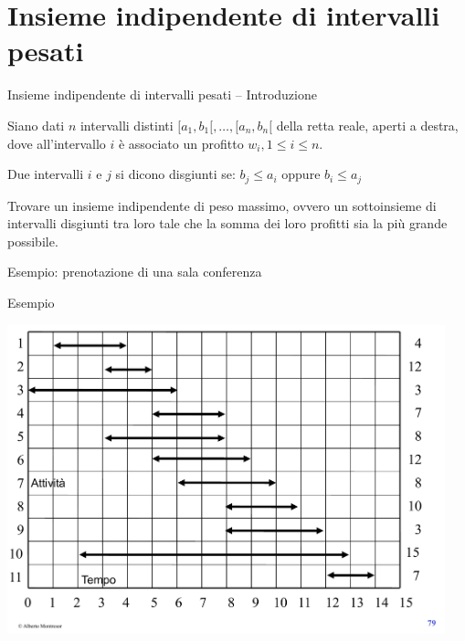 \section{Insieme indipendente di intervalli pesati}

\begin{frame}{Insieme indipendente di intervalli pesati -- Introduzione}

\vspace{-9pt}
\begin{myboxtitle}[Input]
Siano dati $n$ intervalli distinti $[a_1, b_1[, \ldots, [a_n,b_n[$ della retta reale, aperti a destra, dove all'intervallo $i$ è associato un profitto $w_i, 1 \leq i \leq n$. 
\end{myboxtitle}

\begin{myboxtitle}
Due intervalli $i$ e $j$ si dicono \alert{disgiunti} se:  $b_j \leq a_i$  oppure  $b_i \leq a_j$
\end{myboxtitle}

\begin{myboxtitle}[Problema]
Trovare un \alert{insieme indipendente di peso massimo}, ovvero un sottoinsieme di intervalli disgiunti tra loro tale che la somma dei loro profitti sia la più
grande possibile.
\BI
\item Esempio: prenotazione di una sala conferenza
\EI
\end{myboxtitle}

\end{frame}

\begin{frame}{Esempio}

\vspace{-12pt}
\begin{center}
\includegraphics[width=0.95\textwidth,page=1]{intervalli-esempio.pdf}
\end{center}

\end{frame}

